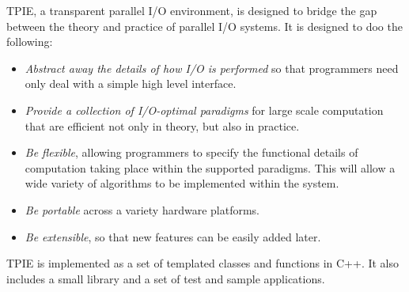 

TPIE, a transparent parallel I/O environment, is designed to bridge the gap
between the theory and practice of parallel I/O systems. It
is designed to doo the following:

\begin{itemize}
\item {\em Abstract away the details of how I/O is performed} so that programmers
need only deal with a simple high level interface.
\item {\em Provide a collection of I/O-optimal paradigms} for large scale computation that are
efficient not only in theory, but also in practice.
\item {\em Be flexible}, allowing programmers to specify the functional
details of computation taking place within the supported paradigms.  This
will allow a wide variety of algorithms to be implemented within the
system.
\item {\em Be portable} across a variety hardware platforms.
\item {\em Be extensible}, so that new features can be easily added later.
\end{itemize}

TPIE is implemented as a set of templated classes and functions in
C++. It also includes a small library and a set of test and
sample applications. 

